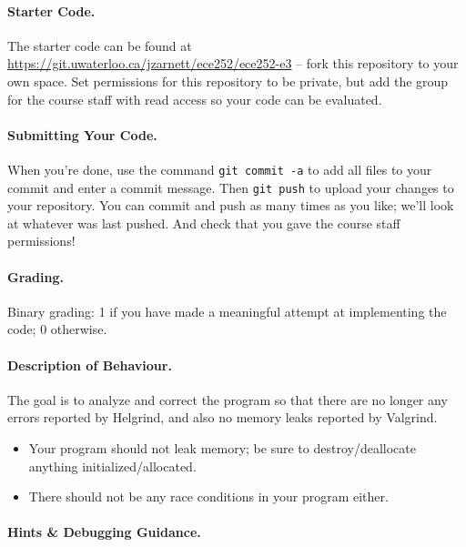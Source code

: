 \paragraph{Starter Code.} The starter code can be found at \url{https://git.uwaterloo.ca/jzarnett/ece252/ece252-e3} -- fork this repository to your own space. Set permissions for this repository to be private, but add the group for the course staff with read access so your code can be evaluated. 

\paragraph{Submitting Your Code.} When you're done, use the command \texttt{git commit -a} to add all files to your commit and enter a commit message. Then \texttt{git push} to upload your changes to your repository. You can commit and push as many times as you like; we'll look at whatever was last pushed. And check that you gave the course staff permissions!

\paragraph{Grading.} Binary grading: 1 if you have made a meaningful attempt at implementing the code; 0 otherwise.

\paragraph{Description of Behaviour.} The goal is to analyze and correct the program so that there are no longer any errors reported by Helgrind, and also no memory leaks reported by Valgrind. 

\begin{itemize}

\item Your program should not leak memory; be sure to destroy/deallocate anything initialized/allocated.

\item There should not be any race conditions in your program either.
\end{itemize}


\paragraph{Hints \& Debugging Guidance.}

